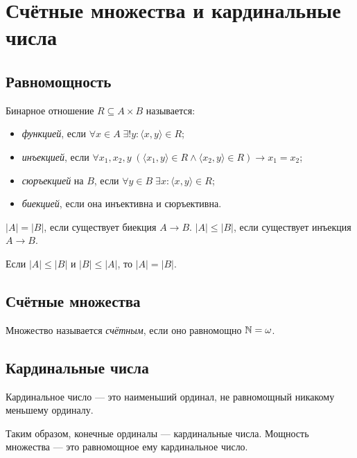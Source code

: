 \documentclass[10pt]{article}
\begin{document}
\section{Счётные множества и кардинальные числа}
\subsection{Равномощность}
\begin{definition}
Бинарное отношение $R \subseteq A \times B$ называется:
\begin{itemize}
    \item \emph{функцией}, если $\forall x \in A \; \exists! y : \langle x, y \rangle \in R$;
    \item \emph{инъекцией}, если $\forall x_1, x_2, y \; (\langle x_1, y \rangle \in R \land \langle x_2, y \rangle \in R) \rightarrow x_1 = x_2$;
    \item \emph{сюръекцией} на $B$, если $\forall y \in B \; \exists x : \langle x, y \rangle \in R$;
    \item \emph{биекцией}, если она инъективна и сюръективна.
\end{itemize}
\end{definition}

\begin{definition}
$|A| = |B|$, если существует биекция $A \to B$.
$|A| \le |B|$, если существует инъекция $A \to B$.
\end{definition}

\begin{theorem}
Если $|A| \le |B|$ и $|B| \le |A|$, то $|A| = |B|$.
\end{theorem}

\subsection{Счётные множества}
Множество называется \emph{счётным}, если оно равномощно $\mathbb{N} = \omega$.

\subsection{Кардинальные числа}
\begin{definition}
Кардинальное число — это наименьший ординал, не равномощный никакому меньшему ординалу.
\end{definition}
Таким образом, конечные ординалы — кардинальные числа. Мощность множества — это равномощное ему кардинальное число.
\end{document}
